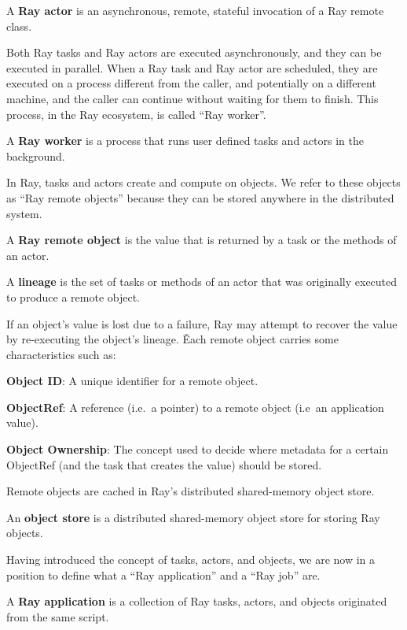 A \textbf{Ray actor} is an asynchronous, remote, stateful invocation of a Ray remote class.
\ed

Both Ray tasks and Ray actors are executed asynchronously, and they can be executed in parallel. When a Ray task and
Ray actor are scheduled, they are executed on a process different from the caller, and potentially on a different
machine, and the caller can continue without waiting for them to finish. This process, in the Ray ecosystem, is
called ``Ray worker''.

A \textbf{Ray worker} is a process that runs user defined tasks and actors in the background.
\ed

In Ray, tasks and actors create and compute on objects. We refer to these objects as ``Ray remote objects'' because
they can be stored anywhere in the distributed system.

A \textbf{Ray remote object} is the value that is returned by a task or the methods of an actor.
\ed

\bd[Lineage]
A \textbf{lineage} is the set of tasks or methods of an actor that was originally executed to produce a remote object.
\ed

If an object's value is lost due to a failure, Ray may attempt to recover the value by re-executing the object's
lineage. \v

Each remote object carries some characteristics such as:
\bit
\item \textbf{Object ID}: A unique identifier for a remote object.
\item \textbf{ObjectRef}: A reference (i.e.\ a pointer) to a remote object (i.e\ an application value).
\item \textbf{Object Ownership}: The concept used to decide where metadata for a certain ObjectRef (and the task that
creates the value) should be stored.
\eit

Remote objects are cached in Ray's distributed shared-memory object store.

An \textbf{object store} is a distributed shared-memory object store for storing Ray objects.
\ed

Having introduced the concept of tasks, actors, and objects, we are now in a position to define what a ``Ray
application'' and a ``Ray job'' are.

A \textbf{Ray application} is a collection of Ray tasks, actors, and objects originated from the same script.
\ed

